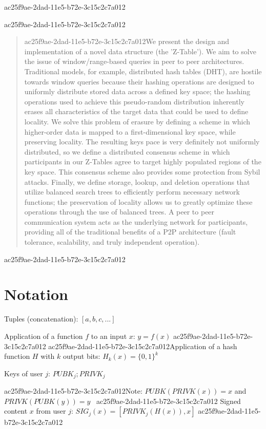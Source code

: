 \documentclass[12pt]{article}
\begin{document}
ac25f9ae-2dad-11e5-b72e-3c15c2c7a012
\maketitle
ac25f9ae-2dad-11e5-b72e-3c15c2c7a012
\begin{abstract}
ac25f9ae-2dad-11e5-b72e-3c15c2c7a012We present the design and implementation of a novel data structure (the 'Z-Table'). We aim to solve the issue of window/range-based queries in peer to peer architectures. Traditional models, for example,  distributed hash tables (DHT), are hostile towards window queries because their hashing operations are designed to uniformly distribute stored data across a defined key space; the hashing operations used to achieve this pseudo-random distribution inherently erases all characteristics of the target data that could be used to define locality. We solve this problem of erasure by defining a scheme in which higher-order data is mapped to a first-dimensional key space, while preserving locality. The resulting keys pace is very definitely not uniformly distributed, so we define a distributed consensus scheme in which participants in our Z-Tables agree to target highly populated regions of the key space. This consensus scheme also provides some protection from Sybil attacks. Finally, we define storage, lookup, and deletion operations that utilize balanced search trees to efficiently perform necessary network functions; the preservation of locality allows us to greatly optimize these operations through the use of balanced trees. A peer to peer communication system acts as the underlying network for participants, providing all of the traditional benefits of a P2P architecture (fault tolerance, scalability, and truly independent operation).
\end{abstract}

ac25f9ae-2dad-11e5-b72e-3c15c2c7a012\section{Notation}

Tuples (concatenation): $[a,b,c,...]$

Application of a function $f$ to an input $x$: $y=f(x)$
ac25f9ae-2dad-11e5-b72e-3c15c2c7a012
ac25f9ae-2dad-11e5-b72e-3c15c2c7a012Application of a hash function $H$ with $k$ output bits: $H_{k}(x) = \{0,1\}^k$

Keys of user $j$: $ PUBK_j; PRIVK_j $

ac25f9ae-2dad-11e5-b72e-3c15c2c7a012Note: $PUBK(PRIVK(x)) = x$ and $PRIVK(PUBK(y)) = y$~
ac25f9ae-2dad-11e5-b72e-3c15c2c7a012
Signed content $x$ from user $j$: $SIG_j(x) = \left[ PRIVK_j( H(x) ), x \right]$
ac25f9ae-2dad-11e5-b72e-3c15c2c7a012
\end{document}
